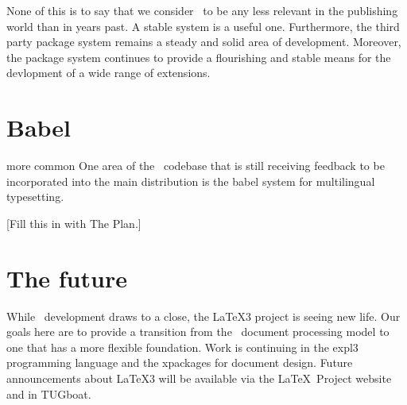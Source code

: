 \documentclass{ltnews}
\begin{document}
None of this is to say that we consider \LaTeXe\ to be any less
relevant in the publishing world than in years past. A stable system
is a useful one. Furthermore, the third party package system remains a
steady and solid area of development.
Moreover, the package system continues to provide a flourishing and stable
means
for the devlopment of a wide range of extensions.

\section{Babel}

more common
One area of the \LaTeXe\ codebase that is still receiving feedback to
be incorporated into the main distribution is the babel system for
multilingual typesetting.

[Fill this in with The Plan.]


\section{The future}

While \LaTeXe\ development draws to a close, the \LaTeX3 project is
seeing new life. Our goals here are to provide a transition from the
\LaTeXe\ document processing model to one that has a more flexible
foundation. Work is continuing in the \textsf{expl3} programming
language and the \textsf{xpackages} for document design. Future
announcements
about \LaTeX3 will be available via the \LaTeX\ Project
website and in TUGboat.
\end{document}
